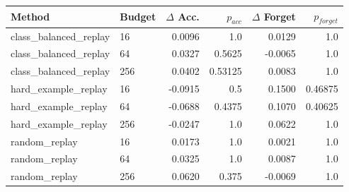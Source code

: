 \begin{tabular}{llrrrr}
\toprule
Method & Budget & $\Delta$ Acc. & $p_{acc}$ & $\Delta$ Forget & $p_{forget}$ \\
\midrule
class_balanced_replay & 16 & 0.0096 & 1.0 & 0.0129 & 1.0 \\
class_balanced_replay & 64 & 0.0327 & 0.5625 & -0.0065 & 1.0 \\
class_balanced_replay & 256 & 0.0402 & 0.53125 & 0.0083 & 1.0 \\
hard_example_replay & 16 & -0.0915 & 0.5 & 0.1500 & 0.46875 \\
hard_example_replay & 64 & -0.0688 & 0.4375 & 0.1070 & 0.40625 \\
hard_example_replay & 256 & -0.0247 & 1.0 & 0.0622 & 1.0 \\
random_replay & 16 & 0.0173 & 1.0 & 0.0021 & 1.0 \\
random_replay & 64 & 0.0325 & 1.0 & 0.0087 & 1.0 \\
random_replay & 256 & 0.0620 & 0.375 & -0.0069 & 1.0 \\
\bottomrule
\end{tabular}
